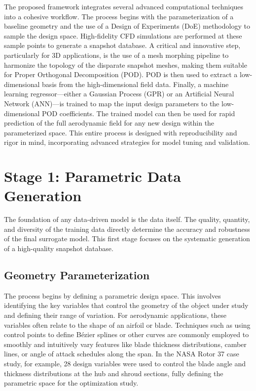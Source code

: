 \documentclass[dscexam, EN]{ufabcFHZh}
\begin{document}
The proposed framework integrates several advanced computational techniques into a cohesive workflow. The process begins with the parameterization of a baseline geometry and the use of a Design of Experiments (DoE) methodology to sample the design space. High-fidelity CFD simulations are performed at these sample points to generate a snapshot database. A critical and innovative step, particularly for 3D applications, is the use of a mesh morphing pipeline to harmonize the topology of the disparate snapshot meshes, making them suitable for Proper Orthogonal Decomposition (POD). POD is then used to extract a low-dimensional basis from the high-dimensional field data. Finally, a machine learning regressor—either a Gaussian Process (GPR) or an Artificial Neural Network (ANN)—is trained to map the input design parameters to the low-dimensional POD coefficients. The trained model can then be used for rapid prediction of the full aerodynamic field for any new design within the parameterized space. This entire process is designed with reproducibility and rigor in mind, incorporating advanced strategies for model tuning and validation.

\section{Stage 1: Parametric Data Generation}

The foundation of any data-driven model is the data itself. The quality, quantity, and diversity of the training data directly determine the accuracy and robustness of the final surrogate model. This first stage focuses on the systematic generation of a high-quality snapshot database.


\subsection{Geometry Parameterization}

The process begins by defining a parametric design space. This involves identifying the key variables that control the geometry of the object under study and defining their range of variation. For aerodynamic applications, these variables often relate to the shape of an airfoil or blade. Techniques such as using control points to define Bézier splines or other curves are commonly employed to smoothly and intuitively vary features like blade thickness distributions, camber lines, or angle of attack schedules along the span. In the NASA Rotor 37 case study, for example, 28 design variables were used to control the blade angle and thickness distributions at the hub and shroud sections, fully defining the parametric space for the optimization study.
\end{document}
